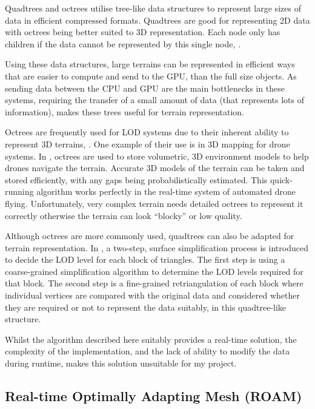 \documentclass[notitlepage,12pt]{article}
\begin{document}
Quadtrees and octrees utilise tree-like data structures to represent large sizes of data in efficient compressed formats. Quadtrees are good for representing 2D data with octrees being better suited to 3D representation. Each node only has children if the data cannot be represented by this single node, \cite{quadtreesOctrees}. 

Using these data structures, large terrains can be represented in efficient ways that are easier to compute and send to the GPU, than the full size objects. As sending data between the CPU and GPU are the main bottlenecks in these systems, requiring the transfer of a small amount of data (that represents lots of information), makes these trees useful for terrain representation.

Octrees are frequently used for LOD systems due to their inherent ability to represent 3D terrains, \cite{lod}. One example of their use is in 3D mapping for drone systems. In \cite{octrees}, octrees are used to store volumetric, 3D environment models to help drones navigate the terrain. Accurate 3D models of the terrain can be taken and stored efficiently, with any gaps being probabilistically estimated. This quick-running algorithm works perfectly in the real-time system of automated drone flying. Unfortunately, very complex terrain needs detailed octrees to represent it correctly otherwise the terrain can look ``blocky'' or low quality.

Although octrees are more commonly used, quadtrees can also be adapted for terrain representation. In \cite{quadtrees}, a two-step, surface simplification process is introduced to decide the LOD level for each block of triangles. The first step is using a coarse-grained simplification algorithm to determine the LOD levels required for that block. The second step is a fine-grained retriangulation of each block where individual vertices are compared with the original data and considered whether they are required or not to represent the data suitably, in this quadtree-like structure.

Whilst the algorithm described here suitably provides a real-time solution, the complexity of the implementation, and the lack of ability to modify the data during runtime, makes this solution unsuitable for my project.

\subsection{Real-time Optimally Adapting Mesh (ROAM)}
\end{document}
